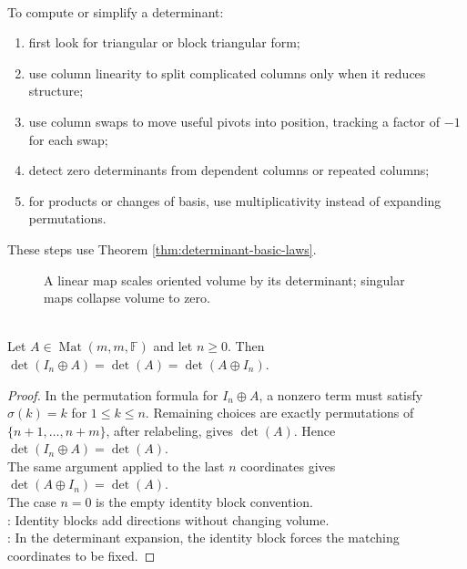 \begin{method} \label{meth:determinant-by-structure} \\
To compute or simplify a determinant:
\begin{enumerate}[label=(\roman*)]
\setlength{\itemsep}{0pt}
\item first look for triangular or block triangular form;
\item use column linearity to split complicated columns only when it reduces structure;
\item use column swaps to move useful pivots into position, tracking a factor of $-1$ for each swap;
\item detect zero determinants from dependent columns or repeated columns;
\item for products or changes of basis, use multiplicativity instead of expanding permutations.
\end{enumerate}
These steps use Theorem \ref{thm:determinant-basic-laws}.
\end{method}

\begin{figure}[H]
  \centering
  
  \caption{A linear map scales oriented volume by its determinant; singular maps collapse volume to zero.}
  \label{fig:matrix-determinant-volume-scaling}
\end{figure}

\begin{lemma} \label{lem:determinant-identity-direct-sum} \\
Let $A\in\operatorname{Mat}(m,m,\mathbb{F})$ and let $n\geq0$. Then $\det(I_n\oplus A)=\det(A)=\det(A\oplus I_n)$.
\begin{proof}
In the permutation formula for $I_n\oplus A$, a nonzero term must satisfy $\sigma(k)=k$ for $1\leq k\leq n$. Remaining choices are exactly permutations of $\{n+1,\ldots,n+m\}$, after relabeling, gives $\det(A)$. Hence $\det(I_n\oplus A)=\det(A)$.\\
The same argument applied to the last $n$ coordinates gives $\det(A\oplus I_n)=\det(A)$.\\
The case $n=0$ is the empty identity block convention.\\
: Identity blocks add directions without changing volume.\\
: In the determinant expansion, the identity block forces the matching coordinates to be fixed.
\end{proof}
\end{lemma}

